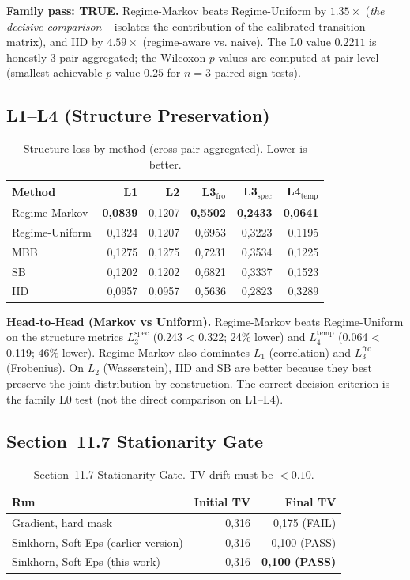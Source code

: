 \documentclass[11pt,a4paper]{article}
\theoremstyle{definition}
\begin{document}
\textbf{Family pass: TRUE.} Regime-Markov beats Regime-Uniform by $1.35\times$ (\emph{the decisive comparison} -- isolates the contribution of the calibrated transition matrix), and IID by $4.59\times$ (regime-aware vs. naive). The L0 value $0.2211$ is honestly 3-pair-aggregated; the Wilcoxon $p$-values are computed at pair level (smallest achievable $p$-value $0.25$ for $n=3$ paired sign tests).

\subsection{L1--L4 (Structure Preservation)}

\begin{table}[h]
\centering
\caption{Structure loss by method (cross-pair aggregated). Lower is better.}
\begin{tabular}{lrrrrr}
\toprule
Method & L1 & L2 & L3$_{\text{fro}}$ & L3$_{\text{spec}}$ & L4$_{\text{temp}}$ \\
\midrule
Regime-Markov  & \textbf{0,0839} & 0,1207 & \textbf{0,5502} & \textbf{0,2433} & \textbf{0,0641} \\
Regime-Uniform & 0,1324 & 0,1207 & 0,6953 & 0,3223 & 0,1195 \\
MBB            & 0,1275 & 0,1275 & 0,7231 & 0,3534 & 0,1225 \\
SB             & 0,1202 & 0,1202 & 0,6821 & 0,3337 & 0,1523 \\
IID            & 0,0957 & 0,0957 & 0,5636 & 0,2823 & 0,3289 \\
\bottomrule
\end{tabular}
\end{table}

\textbf{Head-to-Head (Markov vs Uniform).} Regime-Markov beats Regime-Uniform on the structure metrics $L_3^{\text{spec}}$ (0.243 < 0.322; 24\% lower) and $L_4^{\text{temp}}$ (0.064 < 0.119; 46\% lower). Regime-Markov also dominates $L_1$ (correlation) and $L_3^{\text{fro}}$ (Frobenius). On $L_2$ (Wasserstein), IID and SB are better because they best preserve the joint distribution by construction. The correct decision criterion is the family L0 test (not the direct comparison on L1--L4).

\subsection{Section~11.7 Stationarity Gate}

\begin{table}[h]
\centering
\caption{Section~11.7 Stationarity Gate. TV drift must be $< 0.10$.}
\begin{tabular}{lrr}
\toprule
Run & Initial TV & Final TV \\
\midrule
Gradient, hard mask              & 0,316 & 0,175 (FAIL) \\
Sinkhorn, Soft-Eps (earlier version) & 0,316 & 0,100 (PASS) \\
Sinkhorn, Soft-Eps (this work)     & 0,316 & \textbf{0,100 (PASS)} \\
\bottomrule
\end{tabular}
\end{table}
\end{document}
